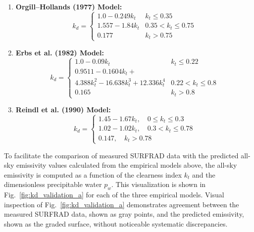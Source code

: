\documentclass[preprint,12pt]{elsarticle}
\begin{document}
\begin{enumerate}

\item \textbf{Orgill–Hollands (1977) Model:}
\begin{equation}
k_d = \begin{cases}
1.0 - 0.249 k_t & k_t \leq 0.35 \\
1.557 - 1.84 k_t & 0.35 < k_t \leq 0.75 \\
0.177 & k_t > 0.75
\end{cases}
\end{equation}

\item \textbf{Erbs et al. (1982) Model:}
\begin{equation}
k_d = \begin{cases}
1.0 - 0.09 k_t & k_t \leq 0.22 \\
0.9511 - 0.1604 k_t + \\
4.388 k_t^2 - 16.638 k_t^3 + 12.336 k_t^4 & 0.22 < k_t \leq 0.8 \\
0.165 & k_t > 0.8
\end{cases}
\end{equation}

\item \textbf{Reindl et al. (1990) Model:}
\begin{equation}
k_d = \begin{cases}
1.45 - 1.67 k_t, \quad 0 \leq k_t \leq 0.3 \\
1.02 - 1.02 k_t, \quad 0.3 < k_t \leq 0.78 \\
0.147, \quad k_t > 0.78
\end{cases}
\end{equation}

\end{enumerate}

To facilitate the comparison of measured SURFRAD data with the predicted all-sky emissivity values calculated from the empirical models above, the all-sky emissivity is computed as a function of the clearness index $k_t$ and the dimensionless precipitable water $p_w$. This visualization is shown in Fig.~\ref{fig:kd_validation_a} for each of the three empirical models. Visual inspection of Fig.~\ref{fig:kd_validation_a} demonstrates agreement between the measured SURFRAD data, shown as gray points, and the predicted emissivity, shown as the graded surface, without noticeable systematic discrepancies. %
\end{document}
